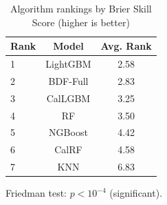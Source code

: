 \begin{table}[htbp]
\centering
\caption{Algorithm rankings by Brier Skill Score (higher is better)}
\label{tab:rankings-bss}
\begin{tabular}{lcc}
\toprule
Rank & Model & Avg. Rank \\
\midrule
1 & LightGBM & 2.58 \\
2 & BDF-Full & 2.83 \\
3 & CalLGBM & 3.25 \\
4 & RF & 3.50 \\
5 & NGBoost & 4.42 \\
6 & CalRF & 4.58 \\
7 & KNN & 6.83 \\
\bottomrule
\end{tabular}
\par\smallskip\footnotesize{Friedman test: $p < 10^{-4}$ (significant).}
\end{table}
